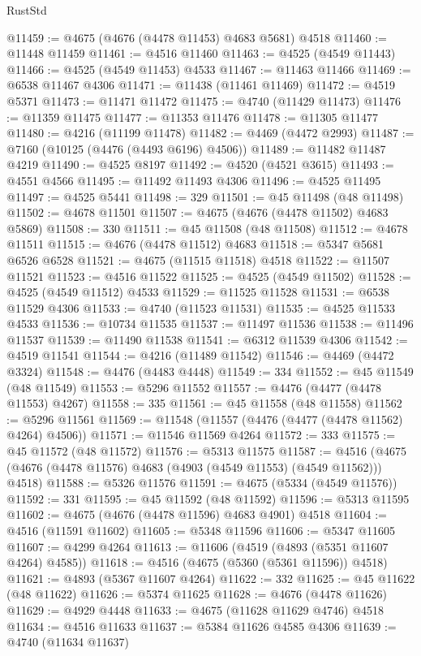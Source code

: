 \begin{lexlean}{RustStd}
\begin{coremodule}
@11459 := @4675 (@4676 (@4478 @11453) @4683 @5681) @4518
@11460 := @11448 @11459
@11461 := @4516 @11460
@11463 := @4525 (@4549 @11443)
@11466 := @4525 (@4549 @11453) @4533
@11467 := @11463 @11466
@11469 := @6538 @11467 @4306
@11471 := @11438 (@11461 @11469)
@11472 := @4519 @5371
@11473 := @11471 @11472
@11475 := @4740 (@11429 @11473)
@11476 := @11359 @11475
@11477 := @11353 @11476
@11478 := @11305 @11477
@11480 := @4216 (@11199 @11478)
@11482 := @4469 (@4472 @2993)
@11487 := @7160 (@10125 (@4476 (@4493 @6196) @4506))
@11489 := @11482 @11487 @4219
@11490 := @4525 @8197
@11492 := @4520 (@4521 @3615)
@11493 := @4551 @4566
@11495 := @11492 @11493 @4306
@11496 := @4525 @11495
@11497 := @4525 @5441
@11498 := 329
@11501 := @45 @11498 (@48 @11498)
@11502 := @4678 @11501
@11507 := @4675 (@4676 (@4478 @11502) @4683 @5869)
@11508 := 330
@11511 := @45 @11508 (@48 @11508)
@11512 := @4678 @11511
@11515 := @4676 (@4478 @11512) @4683
@11518 := @5347 @5681 @6526 @6528
@11521 := @4675 (@11515 @11518) @4518
@11522 := @11507 @11521
@11523 := @4516 @11522
@11525 := @4525 (@4549 @11502)
@11528 := @4525 (@4549 @11512) @4533
@11529 := @11525 @11528
@11531 := @6538 @11529 @4306
@11533 := @4740 (@11523 @11531)
@11535 := @4525 @11533 @4533
@11536 := @10734 @11535
@11537 := @11497 @11536
@11538 := @11496 @11537
@11539 := @11490 @11538
@11541 := @6312 @11539 @4306
@11542 := @4519 @11541
@11544 := @4216 (@11489 @11542)
@11546 := @4469 (@4472 @3324)
@11548 := @4476 (@4483 @4448)
@11549 := 334
@11552 := @45 @11549 (@48 @11549)
@11553 := @5296 @11552
@11557 := @4476 (@4477 (@4478 @11553) @4267)
@11558 := 335
@11561 := @45 @11558 (@48 @11558)
@11562 := @5296 @11561
@11569 := @11548 (@11557 (@4476 (@4477 (@4478 @11562) @4264) @4506))
@11571 := @11546 @11569 @4264
@11572 := 333
@11575 := @45 @11572 (@48 @11572)
@11576 := @5313 @11575
@11587 := @4516 (@4675 (@4676 (@4478 @11576) @4683 (@4903 (@4549 @11553) (@4549 @11562))) @4518)
@11588 := @5326 @11576
@11591 := @4675 (@5334 (@4549 @11576))
@11592 := 331
@11595 := @45 @11592 (@48 @11592)
@11596 := @5313 @11595
@11602 := @4675 (@4676 (@4478 @11596) @4683 @4901) @4518
@11604 := @4516 (@11591 @11602)
@11605 := @5348 @11596
@11606 := @5347 @11605
@11607 := @4299 @4264
@11613 := @11606 (@4519 (@4893 (@5351 @11607 @4264) @4585))
@11618 := @4516 (@4675 (@5360 (@5361 @11596)) @4518)
@11621 := @4893 (@5367 @11607 @4264)
@11622 := 332
@11625 := @45 @11622 (@48 @11622)
@11626 := @5374 @11625
@11628 := @4676 (@4478 @11626)
@11629 := @4929 @4448
@11633 := @4675 (@11628 @11629 @4746) @4518
@11634 := @4516 @11633
@11637 := @5384 @11626 @4585 @4306
@11639 := @4740 (@11634 @11637)

\end{coremodule}
\end{lexlean}
